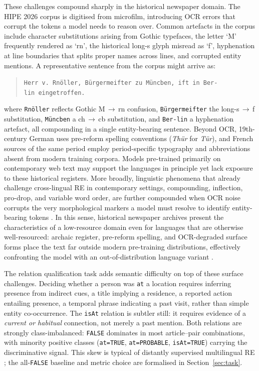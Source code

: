 \documentclass[
]{ceurart}
\theoremstyle{definition}
\begin{document}
These challenges compound sharply in the historical newspaper domain.
The HIPE 2026 corpus is digitised from microfilm, introducing OCR errors that corrupt the tokens a model needs to reason over.
Common artefacts in the corpus include character substitutions arising from Gothic typefaces, the letter `M' frequently rendered as `rn', the historical long-s glyph misread as `f', hyphenation at line boundaries that splits proper names across lines, and corrupted entity mentions.
A representative sentence from the corpus might arrive as:
\begin{quote}
\small\texttt{Herr v. Rnöller, Bürgermeifter zu Müncben, ift in Ber-\\
lin eingetroffen.}
\end{quote}
\noindent where \texttt{Rnöller} reflects Gothic M\,$\to$\,rn confusion, \texttt{Bürgermeifter} the long-s\,$\to$\,f substitution, \texttt{Müncben} a ch\,$\to$\,cb substitution, and \texttt{Ber-lin} a hyphenation artefact, all compounding in a single entity-bearing sentence.
Beyond OCR, 19th-century German uses pre-reform spelling conventions (\textit{Thür} for \textit{Tür}), and French sources of the same period employ period-specific typography and abbreviations absent from modern training corpora.
Models pre-trained primarily on contemporary web text may support the languages in principle yet lack exposure to these historical registers.
More broadly, linguistic phenomena that already challenge cross-lingual RE in contemporary settings, compounding, inflection, pro-drop, and variable word order, are further compounded when OCR noise corrupts the very morphological markers a model must resolve to identify entity-bearing tokens \citep{hennig2023multitacred}.
In this sense, historical newspaper archives present the characteristics of a low-resource domain even for languages that are otherwise well-resourced: archaic register, pre-reform spelling, and OCR-degraded surface forms place the text far outside modern pre-training distributions, effectively confronting the model with an out-of-distribution language variant \citep{ali2025multilingual,pakray2025natural}.

The relation qualification task adds semantic difficulty on top of these surface challenges.
Deciding whether a person was \texttt{at} a location requires inferring presence from indirect cues, a title implying a residence, a reported action entailing presence, a temporal phrase indicating a past visit, rather than simple entity co-occurrence.
The \texttt{isAt} relation is subtler still: it requires evidence of a \emph{current or habitual} connection, not merely a past mention.
Both relations are strongly class-imbalanced: \texttt{FALSE} dominates in most article--pair combinations, with minority positive classes (\texttt{at=TRUE}, \texttt{at=PROBABLE}, \texttt{isAt=TRUE}) carrying the discriminative signal.
This skew is typical of distantly supervised multilingual RE \citep{cabot2023redfm,zhang-etal-2019-long,mintz-etal-2009-distant}; the all-\texttt{FALSE} baseline and metric choice are formalised in Section~\ref{sec:task}.
\end{document}
